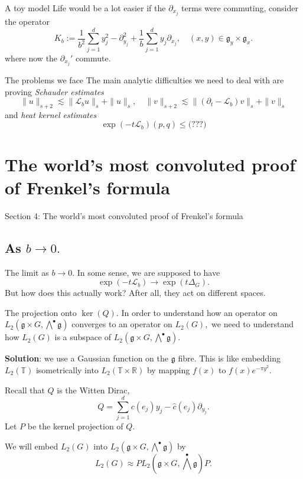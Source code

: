 \documentclass{beamer}
\numberwithin{equation}{section}
\theoremstyle{plain}
\theoremstyle{plain}
\theoremstyle{definition}
\theoremstyle{plain}
\theoremstyle{plain}
\theoremstyle{definition}
\newcommand{\Rl}{\mathbb{R}}
\newcommand{\Circ}{\mathbb{T}}
\newcommand{\Lc}{\mathcal{L}}
\newcommand{\gf}{\mathfrak{g}}
\begin{document}
\begin{frame}{A toy model}
  Life would be a lot easier if the $\partial_{x_j}$ terms were commuting, consider the operator
  \[
    K_b := \frac{1}{b^2}\sum_{j=1}^d y_j^2-\partial_{y_j}^2 + \frac{1}{b}\sum_{j=1}^dy_j\partial_{x_j},\quad (x,y) \in \gf_y\times \gf_x.
  \]
  where now the $\partial_{x_j}'$ commute.
\end{frame}

\begin{frame}{The problems we face}
  The main analytic difficulties we need to deal with are proving \emph{Schauder estimates}
  \[
    \|u\|_{s+2} \lesssim \|\Lc_bu\|_s+\|u\|_s,\quad \|v\|_{s+2} \lesssim \|(\partial_t-\Lc_b)v\|_s+\|v\|_s
  \]
  and \emph{heat kernel estimates}
  \[
    \exp(-t\Lc_b)(p,q) \leq \text{(???)}
  \]
\end{frame}


\section{The world's most convoluted proof of Frenkel's formula}

\begin{frame}
  \huge{Section 4: The world's most convoluted proof of Frenkel's formula}
\end{frame}

\subsection{As $b\to 0.$}

\begin{frame}{The limit as $b\to 0.$}
    In some sense, we are supposed to have
    \[
      \exp(-t\Lc_b)\rightarrow \exp(t\Delta_G).
    \]
    But how does this actually work? After all, they act on different spaces.
\end{frame}

\begin{frame}{The projection onto $\ker(Q).$}
  In order to understand how an operator on $L_2(\gf\times G,\bigwedge^{\bullet}\gf)$ converges to an operator on
  $L_2(G),$ we need to understand how $L_2(G)$ is a subspace of $L_2(\gf\times G,\bigwedge^{\bullet}\gf).$
  
  \textbf{Solution}: we use a Gaussian function on the $\gf$ fibre. 
  This is like embedding $L_2(\Circ)$ isometrically into $L_2(\Circ\times \Rl)$ by mapping $f(x)$ to $f(x)e^{-\pi y^2}.$
  
  \begin{definition}
    Recall that $Q$ is the Witten Dirac,
    \[
      Q = \sum_{j=1}^d c(e_j)y_j - \widehat{c}(e_j)\partial_{y_j}.
    \]
    Let $P$ be the kernel projection of $Q.$
  \end{definition}
  We will embed $L_2(G)$ into $L_2(\gf\times G,\bigwedge^{\bullet}\gf)$ by
  \[
    L_2(G)\approx  PL_2(\gf\times G,\bigwedge^{\bullet}\gf)P.
  \]
\end{frame}
\end{document}

